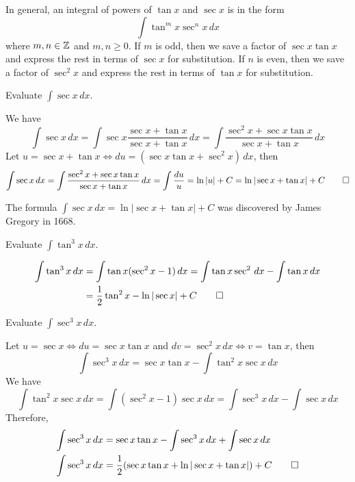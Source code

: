 In general, an integral of powers of \(\tan x\) and \(\sec x\) is in the
form
\[\int\tan^m x\sec^n x\,dx\]
where \(m,n\in\mathbb{Z}\) and \(m,n\geq 0\).
If \(m\) is odd, then we save a factor of \(\sec x\tan x\) and express the
rest in terms of \(\sec x\) for substitution.
If \(n\) is even, then we save a factor of \(\sec^2 x\) and express the
rest in terms of \(\tan x\) for substitution.
\begin{problem}
    Evaluate \(\displaystyle{\int\sec x\,dx}\).
\end{problem}
\begin{solution}
    We have
    \[\int\sec x\,dx=\int\sec x\frac{\sec x+\tan x}{\sec x+\tan x}\,dx
    =\int\frac{\sec^2 x+\sec x\tan x}{\sec x+\tan x}\,dx\]
    Let \(u=\sec x+\tan x\iff du=(\sec x\tan x+\sec^2 x)\,dx\), then
    \[\int\sec x\,dx=\int\frac{\sec^2 x+\sec x\tan x}{\sec x+\tan x}\,dx
    =\int\frac{du}{u}=\ln|u|+C=\ln|\sec x+\tan x|+C\qedhere\]
\end{solution}
The formula \(\displaystyle{\int\sec x\,dx=\ln|\sec x+\tan x|+C}\) was
discovered by James Gregory in 1668.
\begin{problem}
    Evaluate \(\displaystyle{\int\tan^3 x\,dx}\).
\end{problem}
\begin{solution}
    \begin{align*}
    \int\tan^3 x\,dx &= \int\tan x(\sec^2x-1)\,dx
    =\int\tan x\sec^2\,dx-\int\tan x\,dx \\
    &= \frac{1}{2}\tan^2 x-\ln|\sec x|+C \qedhere
    \end{align*}
\end{solution}
\begin{problem}
    Evaluate \(\displaystyle{\int\sec^3 x\,dx}\).
\end{problem}
\begin{solution}
    Let \(u=\sec x\iff du=\sec x\tan x\) and \(dv=\sec^2 x\,dx\iff v=\tan x\),
    then
    \[\int\sec^3 x\,dx=\sec x\tan x-\int\tan^2 x\sec x\,dx\]
    We have
    \[\int\tan^2 x\sec x\,dx=\int(\sec^2 x-1)\sec x\,dx
    =\int\sec^3 x\,dx-\int\sec x\,dx\]
    Therefore,
    \begin{align*}
        \int\sec^3 x\,dx &= \sec x\tan x-\int\sec^3 x\,dx+\int\sec x\,dx \\
        \int\sec^3 x\,dx
        &= \frac{1}{2}(\sec x\tan x+\ln|\sec x+\tan x|)+C \qedhere
    \end{align*}
\end{solution}

